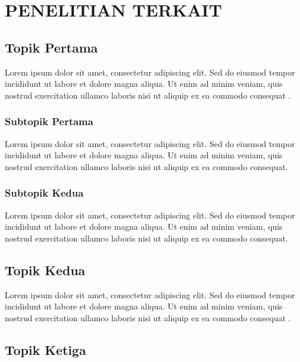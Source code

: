 \chapter{PENELITIAN TERKAIT}

\section{Topik Pertama}


Lorem ipsum dolor sit amet, consectetur adipiscing elit. Sed do eiusmod tempor incididunt ut labore et dolore magna aliqua. Ut enim ad minim veniam, quis nostrud exercitation ullamco laboris nisi ut aliquip ex ea commodo consequat \citep{referensi1}.

\subsection{Subtopik Pertama}

Lorem ipsum dolor sit amet, consectetur adipiscing elit. Sed do eiusmod tempor incididunt ut labore et dolore magna aliqua. Ut enim ad minim veniam, quis nostrud exercitation ullamco laboris nisi ut aliquip ex ea commodo consequat.

\subsection{Subtopik Kedua}

Lorem ipsum dolor sit amet, consectetur adipiscing elit. Sed do eiusmod tempor incididunt ut labore et dolore magna aliqua. Ut enim ad minim veniam, quis nostrud exercitation ullamco laboris nisi ut aliquip ex ea commodo consequat.

\section{Topik Kedua}


Lorem ipsum dolor sit amet, consectetur adipiscing elit. Sed do eiusmod tempor incididunt ut labore et dolore magna aliqua. Ut enim ad minim veniam, quis nostrud exercitation ullamco laboris nisi ut aliquip ex ea commodo consequat \citep{referensi2}.

\section{Topik Ketiga}

